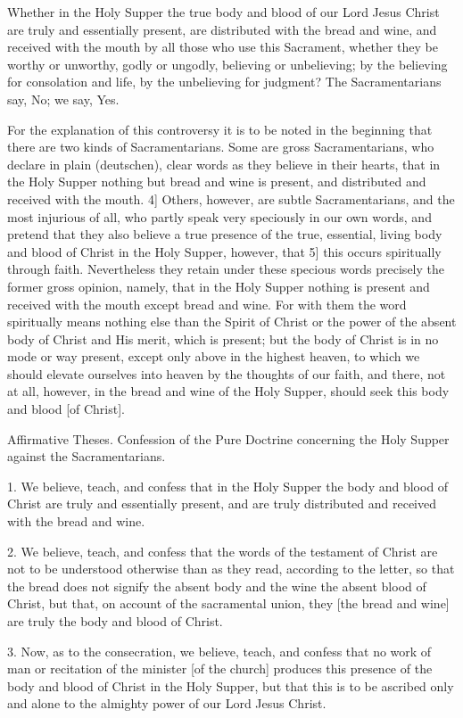 Whether in the Holy Supper the true body and blood of our Lord Jesus Christ are truly and essentially present, are distributed with the bread and wine, and received with the mouth by all those who use this Sacrament, whether they be worthy or unworthy, godly or ungodly, believing or unbelieving; by the believing for consolation and life, by the unbelieving for judgment? The Sacramentarians say, No; we say, Yes.

For the explanation of this controversy it is to be noted in the beginning that there are two kinds of Sacramentarians. Some are gross Sacramentarians, who declare in plain (deutschen), clear words as they believe in their hearts, that in the Holy Supper nothing but bread and wine is present, and distributed and received with the mouth. 4] Others, however, are subtle Sacramentarians, and the most injurious of all, who partly speak very speciously in our own words, and pretend that they also believe a true presence of the true, essential, living body and blood of Christ in the Holy Supper, however, that 5] this occurs spiritually through faith. Nevertheless they retain under these specious words precisely the former gross opinion, namely, that in the Holy Supper nothing is present and received with the mouth except bread and wine. For with them the word spiritually means nothing else than the Spirit of Christ or the power of the absent body of Christ and His merit, which is present; but the body of Christ is in no mode or way present, except only above in the highest heaven, to which we should elevate ourselves into heaven by the thoughts of our faith, and there, not at all, however, in the bread and wine of the Holy Supper, should seek this body and blood [of Christ].

Affirmative Theses.
Confession of the Pure Doctrine concerning the Holy Supper against the Sacramentarians.

1. We believe, teach, and confess that in the Holy Supper the body and blood of Christ are truly and essentially present, and are truly distributed and received with the bread and wine.

2. We believe, teach, and confess that the words of the testament of Christ are not to be understood otherwise than as they read, according to the letter, so that the bread does not signify the absent body and the wine the absent blood of Christ, but that, on account of the sacramental union, they [the bread and wine] are truly the body and blood of Christ.

3. Now, as to the consecration, we believe, teach, and confess that no work of man or recitation of the minister [of the church] produces this presence of the body and blood of Christ in the Holy Supper, but that this is to be ascribed only and alone to the almighty power of our Lord Jesus Christ.

